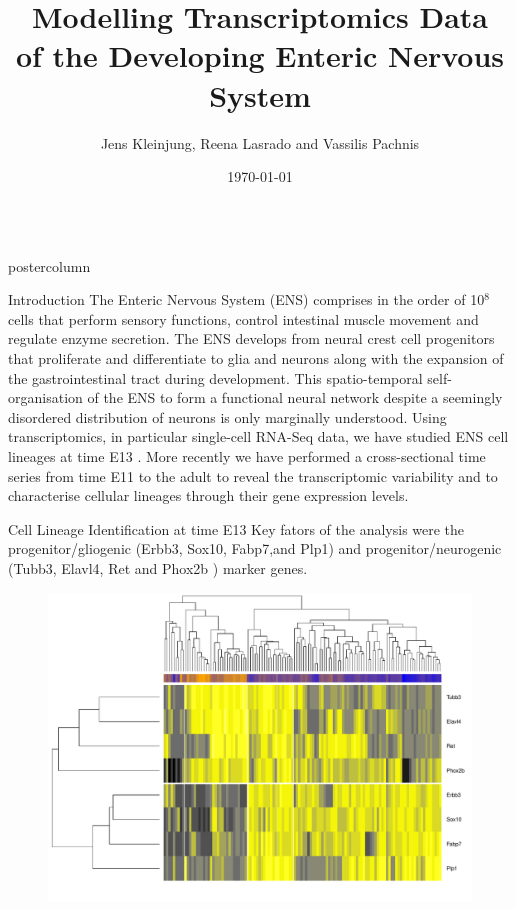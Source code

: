 \documentclass{beamer}
\title{\huge  Modelling Transcriptomics Data \\of the Developing Enteric Nervous System}
\author{Jens Kleinjung, Reena Lasrado and Vassilis Pachnis}
\institute[]{The Francis Crick Institute}
\date{\today}
\newlength{\columnheight}
\begin{document}
\begin{frame}
\begin{columns}
\begin{column}{.45\textwidth}
\begin{beamercolorbox}[center]{postercolumn}
\begin{minipage}{.98\textwidth}  %
\parbox[t][\columnheight]{\textwidth}{ %
\begin{myblock}{Introduction}
The Enteric Nervous System (ENS) comprises in the order of 10$^8$ cells that
perform sensory functions, control intestinal muscle movement and regulate
enzyme secretion. The ENS develops from neural crest cell progenitors that
proliferate and differentiate to glia and neurons along with the expansion
of the gastrointestinal tract during development.
This spatio-temporal self-organisation of the ENS to form a functional
neural network despite a seemingly disordered distribution of neurons is
only marginally understood.
Using transcriptomics, in particular single-cell RNA-Seq data, we have studied
ENS cell lineages at time E13 \cite{Lasrado_2017}.
More recently we have performed a cross-sectional time series from time E11 to
the adult to reveal the transcriptomic variability and to characterise cellular
lineages through their gene expression levels.
\end{myblock}\vfill
\begin{myblock}{Cell Lineage Identification at time E13}
Key fators of the analysis were the
progenitor/gliogenic (Erbb3, Sox10, Fabp7,and Plp1) and
progenitor/neurogenic (Tubb3, Elavl4, Ret and Phox2b )
marker genes.
\begin{figure}
\begin{minipage}{1.0\textwidth}
	\centering\includegraphics[width=1.0\textwidth]{./heatmap}

\end{minipage}
\end{figure}
\end{myblock}}
\end{minipage}
\end{beamercolorbox}
\end{column}
\end{columns}
\end{frame}
\end{document}
